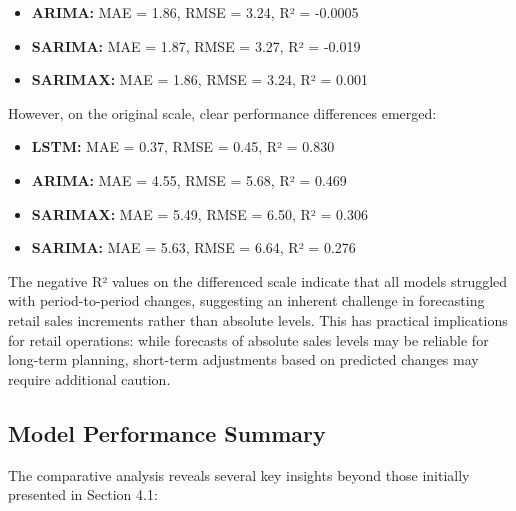 \documentclass[12pt,a4paper]{report}
\begin{document}
\begin{itemize}
    \item \textbf{ARIMA:} MAE = 1.86, RMSE = 3.24, R² = -0.0005
    \item \textbf{SARIMA:} MAE = 1.87, RMSE = 3.27, R² = -0.019
    \item \textbf{SARIMAX:} MAE = 1.86, RMSE = 3.24, R² = 0.001
\end{itemize}

However, on the original scale, clear performance differences emerged:
\begin{itemize}
    \item \textbf{LSTM:} MAE = 0.37, RMSE = 0.45, R² = 0.830
    \item \textbf{ARIMA:} MAE = 4.55, RMSE = 5.68, R² = 0.469
    \item \textbf{SARIMAX:} MAE = 5.49, RMSE = 6.50, R² = 0.306
    \item \textbf{SARIMA:} MAE = 5.63, RMSE = 6.64, R² = 0.276
\end{itemize}

The negative R² values on the differenced scale indicate that all models struggled with period-to-period changes, suggesting an inherent challenge in forecasting retail sales increments rather than absolute levels. This has practical implications for retail operations: while forecasts of absolute sales levels may be reliable for long-term planning, short-term adjustments based on predicted changes may require additional caution.

\subsection{Model Performance Summary}
The comparative analysis reveals several key insights beyond those initially presented in Section 4.1:
\end{document}

